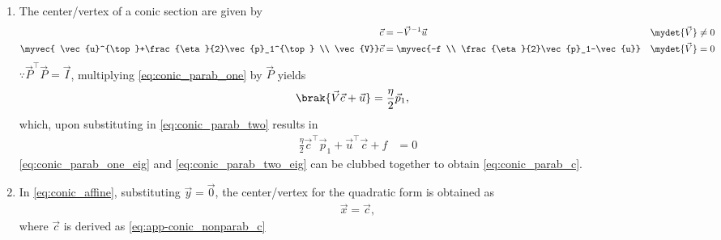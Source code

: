 \documentclass{article}
\numberwithin{equation}{section}
\numberwithin{figure}{section}
\begin{document}
\begin{enumerate}[label=\thesubsection.\arabic*.,ref=\thesubsection.\theenumi]
\begin{multline}
\label{eq:conic_parab_foc_len_temp} 
\end{multline}
%
which is the equation of a parabola. 
Thus, \eqref{eq:conic_parab_foc_len_temp} 
can be expressed as \eqref{eq:app-conic_simp_temp_parab} by choosing
\begin{align}
	\eta = 2\vec{u}^{\top}\vec{p}_1
\end{align}
and $\vec{c}$ in \eqref{eq:conic_simp} such that
\begin{align}
\label{eq:conic_parab_one}
	2\vec{P}^{\top}\brak{\vec{V}\vec{c}+\vec{u}} &= \eta\myvec{1\\0}
\\
	\vec{c}^{\top}\brak{\vec{V}\vec{c} + \vec{u}}+ \vec{u}^{\top}\vec{c} + f&= 0
\label{eq:conic_parab_two}
\end{align}
%
	\item
		The center/vertex of a conic section are given by
  \begin{align}
    \label{eq:app-conic_nonparab_c}
	    \vec{c} &= - \vec{V}^{-1}\vec{u}  & \mydet{\vec{V}} \ne 0
    \\
	    \myvec{ \vec{u}^{\top}+\frac{\eta}{2}\vec{p}_1^{\top} \\ \vec{V}}\vec{c} &= \myvec{-f \\ \frac{\eta}{2}\vec{p}_1-\vec{u}}  
& \mydet{\vec{V}} = 0
    \label{eq:conic_parab_c}
    \end{align}	
\solution	
$\because
\vec{P}^{\top}\vec{P} = \vec{I}$,
multiplying \eqref{eq:conic_parab_one} by $\vec{P}$ yields
\begin{align}
\label{eq:conic_parab_one_eig}
	\brak{\vec{V}\vec{c}+\vec{u}} &= \frac{\eta}{2}\vec{p}_1,
\end{align}
which, upon substituting in \eqref{eq:conic_parab_two}
results in 
\begin{align}
\frac{\eta}{2}\vec{c}^{\top}\vec{p}_1 + \vec{u}^{\top}\vec{c} + f&= 0
\label{eq:conic_parab_two_eig}
\end{align}
\eqref{eq:conic_parab_one_eig} and \eqref{eq:conic_parab_two_eig} can be clubbed together to obtain \eqref{eq:conic_parab_c}.
\item
			In 
			\eqref{eq:conic_affine},
	substituting $\vec{y} = \vec{0}$, the center/vertex for the quadratic form is obtained as
    \begin{align}
	    \vec{x} = \vec{c}, 
    \end{align}
			where $\vec{c}$ is derived as 
    \eqref{eq:app-conic_nonparab_c}

\end{enumerate}
\end{document}
